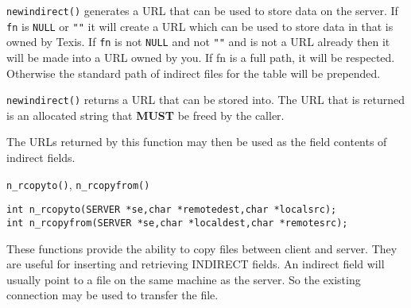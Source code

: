 %
%
%
%

\verb`newindirect()` generates a URL that can be used to store data on
the server.  If \verb`fn` is \verb`NULL` or \verb`""` it will create a
URL which can be used to store data in that is owned by Texis.  If
\verb`fn` is not \verb`NULL` and not \verb`""` and is not a URL already
then it will be made into a URL owned by you.  If fn is a full path, it
will be respected.  Otherwise the standard path of indirect files for
the table will be prepended.

\verb`newindirect()` returns a URL that can be stored into.  The URL
that is returned is an allocated string that {\bf MUST} be freed by the
caller.

The URLs returned by this function may then be used
as the field contents of indirect fields.

\SEE
\verb`n_rcopyto()`, \verb`n_rcopyfrom()`


\SYNOPSIS
\begin{verbatim}
int n_rcopyto(SERVER *se,char *remotedest,char *localsrc);
int n_rcopyfrom(SERVER *se,char *localdest,char *remotesrc);
\end{verbatim}

\DESCRIPTION

These functions provide the ability to copy files between client
and server. They are useful for inserting and retrieving INDIRECT fields.
An indirect field will usually point to a file on the same machine as the
server. So the existing connection may be used to transfer the file.

